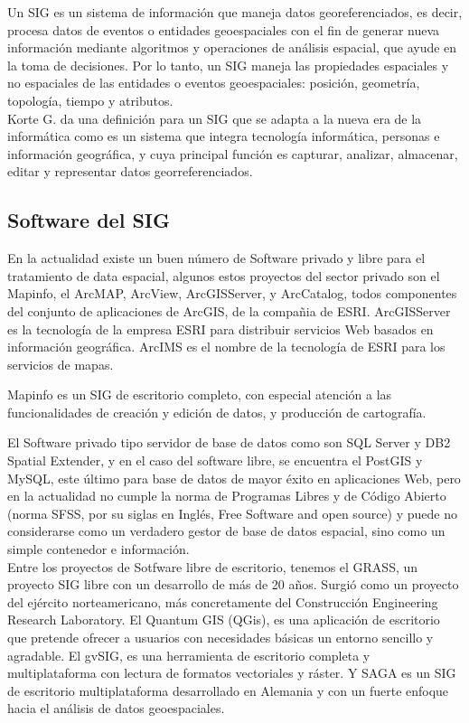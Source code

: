 \documentclass[12pt]{report}
\begin{document}
			Un SIG es un sistema de información que maneja datos georeferenciados, es decir, procesa datos de eventos o entidades geoespaciales con el fin de generar nueva información mediante algoritmos y operaciones de análisis espacial, que ayude en la toma de decisiones. Por lo tanto,  un SIG maneja las propiedades espaciales y no espaciales de las entidades o eventos geoespaciales: posición, geometría, topología, tiempo y atributos. \\  
			
	         Korte G. \cite{Korte}  da una definición para un SIG que se adapta  a la nueva era de la informática como  es un sistema que integra tecnología informática, personas e información geográfica, y cuya principal función es capturar, analizar, almacenar, editar y representar datos georreferenciados.\\
			
		
			
			\subsection*{Software del SIG}
			
			
			En la actualidad existe un buen número de Software privado y libre para el tratamiento de data espacial,  algunos estos proyectos del sector privado son el Mapinfo,  el ArcMAP,  ArcView, ArcGISServer, y ArcCatalog,  todos componentes del conjunto de aplicaciones de ArcGIS, de la  compañia  de ESRI. ArcGISServer es la tecnología de la empresa ESRI para distribuir servicios Web basados en información geográfica.  ArcIMS es el nombre de la tecnología de ESRI para los servicios de mapas.
			
			Mapinfo  es un SIG de escritorio completo, con especial atención a las funcionalidades de creación y edición de datos, y producción de cartografía. 
			
			El Software privado tipo servidor de base de datos como son SQL Server y DB2 Spatial Extender, y en el caso del software libre, se encuentra el  PostGIS y MySQL, este último   para base de  datos de mayor éxito en aplicaciones Web, pero en la actualidad no cumple la norma de Programas Libres y de Código Abierto (norma SFSS, por su siglas en Inglés, Free Software and open source) y puede no considerarse como un verdadero gestor de base de datos espacial, sino como un simple contenedor e información. \\  %
			
			Entre los  proyectos de Sotfware libre de escritorio, tenemos el GRASS, un proyecto SIG libre  con un desarrollo de más de 20 años. Surgió como un proyecto del ejército norteamericano, más concretamente del Construcción Engineering Research Laboratory.  El Quantum GIS (QGis),  es una aplicación de escritorio que pretende ofrecer a usuarios con necesidades básicas un entorno sencillo y agradable.  El gvSIG, es una herramienta de escritorio completa y multiplataforma con lectura de formatos vectoriales y  ráster.  Y SAGA  es un SIG de escritorio multiplataforma desarrollado en Alemania y con un fuerte enfoque hacia el análisis de datos geoespaciales. \\
			
\end{document}
